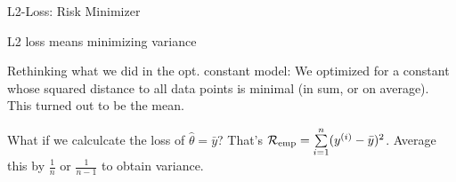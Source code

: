 \documentclass[11pt,compress,t,notes=noshow, xcolor=table]{beamer}
\begin{document}
\begin{vbframe}{L2-Loss: Risk Minimizer}



\end{vbframe}

\begin{vbframe}{L2 loss means minimizing variance}

Rethinking what we did in the opt. constant model:
We optimized for a constant whose squared distance to all data points is minimal
(in sum, or on average). This turned out to be the mean.

\vspace{0.1cm}

What if we calculcate the loss of $\hat{\theta} = \bar{y}$? That's ${\textstyle \mathcal{R}_{\text{emp}} = \sum\limits_{i=1}^n (y^{(i)} - \bar{y})^2}$. Average this by $\frac{1}{n}$ or $\frac{1}{n-1}$ 
to obtain variance. 

\vspace{0.2cm}



\end{vbframe}
\end{document}
